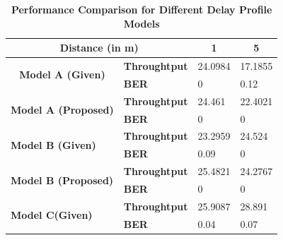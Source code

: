 \documentclass[a4paper]{article}
\begin{document}
\begin{table}[h]
\centering
\caption{\textbf{Performance Comparison for Different Delay Profile Models}}
\label{table:delayProfile}
\begin{tabular}{|l|l|l|l|}
\hline
\multicolumn{2}{|c|}{\textbf{Distance (in m)}}                                                      & \multicolumn{1}{c|}{\textbf{1}} & \multicolumn{1}{c|}{\textbf{5}} \\ \hline
\multicolumn{1}{|c|}{\multirow{2}{*}{\textbf{Model A (Given)}}} & \textbf{Throughtput}              & 24.0984                         & 17.1855                         \\ \cline{2-4}
\multicolumn{1}{|c|}{}                                          & \textbf{BER} & 0                               & 0.12                            \\ \hline
\multirow{2}{*}{\textbf{Model A (Proposed)}}                    & \textbf{Throughtput}              & 24.461                          & 22.4021                         \\ \cline{2-4}
                                                                & \textbf{BER}                      & 0                               & 0                               \\ \hline
\multirow{2}{*}{\textbf{Model B (Given)}}                       & \textbf{Throughtput}              & 23.2959                         & 24.524                          \\ \cline{2-4}
                                                                & \textbf{BER}                      & 0.09                            & 0                               \\ \hline
\multirow{2}{*}{\textbf{Model B (Proposed)}}                    & \textbf{Throughtput}              & 25.4821                         & 24.2767                         \\ \cline{2-4}
                                                                & \textbf{BER}                      & 0                               & 0                               \\ \hline
\multirow{2}{*}{\textbf{Model C(Given)}}                        & \textbf{Throughtput}              & 25.9087                         & 28.891                          \\ \cline{2-4}
                                                                & \textbf{BER}                      & 0.04                            & 0.07                            \\ \hline

\end{tabular}
\end{table}
\end{document}
